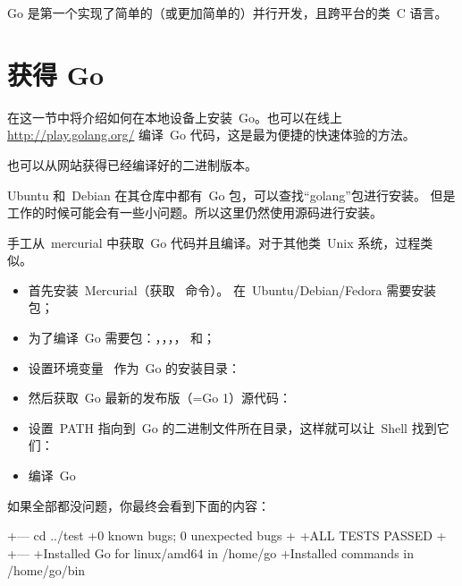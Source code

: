 \begin{lbar}[]
Go 是第一个实现了简单的（或更加简单的）并行开发，且跨平台的类~C 语言。
\end{lbar}

\section{获得 Go}
在这一节中将介绍如何在本地设备上安装~Go。也可以在线上 \url{http://play.golang.org/} 编译~Go 代码，这是最为便捷的快速体验的方法。

也可以从网站\cite{go_install}获得已经编译好的二进制版本。

Ubuntu 和~Debian 在其仓库中都有~Go 包，可以查找``golang''包进行安装。
但是工作的时候可能会有一些小问题。所以这里仍然使用源码进行安装。

手工从~mercurial 中获取~Go 代码并且编译。对于其他类~Unix 系统，过程类似。
\begin{itemize}
\item 首先安装~Mercurial（获取~ 命令）。
在~Ubuntu/Debian/Fedora 需要安装~ 包；

\item 为了编译~Go 需要包：，，，， 和；

\item 设置环境变量~ 作为~Go 的安装目录：
\begin{display}
\pr {}
\end{display}

\item 然后获取~Go 最新的发布版（=Go 1）源代码：
\begin{display}
\pr {}
\end{display}

\item 设置~PATH 指向到~Go 的二进制文件所在目录，这样就可以让~Shell 找到它们：
\begin{display}
\pr {}
\end{display}

\item 编译~Go
\begin{display}
\pr {}
\pr {}
\end{display}
\end{itemize}
如果全部都没问题，你最终会看到下面的内容：
\begin{display}
+--- cd ../test
+0 known bugs; 0 unexpected bugs
+
+ALL TESTS PASSED
+
+---
+Installed Go for linux/amd64 in /home/go
+Installed commands in /home/go/bin
\end{display}

